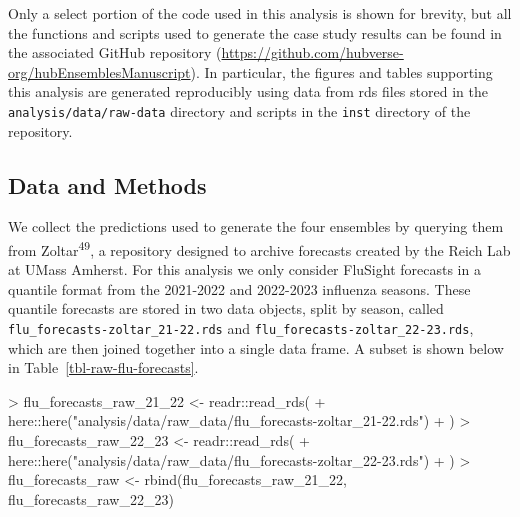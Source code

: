 \documentclass[
  letterpaper,
  DIV=11,
  numbers=noendperiod]{scrartcl}
\newenvironment{Shaded}{\begin{snugshade}}{\end{snugshade}}
\newcommand{\FunctionTok}[1]{\textcolor[rgb]{0.28,0.35,0.67}{#1}}
\newcommand{\NormalTok}[1]{\textcolor[rgb]{0.00,0.23,0.31}{#1}}
\newcommand{\OtherTok}[1]{\textcolor[rgb]{0.00,0.23,0.31}{#1}}
\newcommand{\SpecialCharTok}[1]{\textcolor[rgb]{0.37,0.37,0.37}{#1}}
\newcommand{\StringTok}[1]{\textcolor[rgb]{0.13,0.47,0.30}{#1}}
\begin{document}
Only a select portion of the code used in this analysis is shown for
brevity, but all the functions and scripts used to generate the case
study results can be found in the associated GitHub repository
(\url{https://github.com/hubverse-org/hubEnsemblesManuscript}). In
particular, the figures and tables supporting this analysis are
generated reproducibly using data from rds files stored in the
\texttt{analysis/data/raw-data} directory and scripts in the
\texttt{inst} directory of the repository.

\subsection{Data and Methods}\label{data-and-methods}

We collect the predictions used to generate the four ensembles by
querying them from Zoltar\textsuperscript{49}, a repository designed to
archive forecasts created by the Reich Lab at UMass Amherst. For this
analysis we only consider FluSight forecasts in a quantile format from
the 2021-2022 and 2022-2023 influenza seasons. These quantile forecasts
are stored in two data objects, split by season, called
\texttt{flu\_forecasts-zoltar\_21-22.rds} and
\texttt{flu\_forecasts-zoltar\_22-23.rds}, which are then joined
together into a single data frame. A subset is shown below in
Table~\ref{tbl-raw-flu-forecasts}.

\begin{Shaded}
\begin{Highlighting}[]
\SpecialCharTok{\textgreater{}}\NormalTok{ flu\_forecasts\_raw\_21\_22 }\OtherTok{\textless{}{-}}\NormalTok{ readr}\SpecialCharTok{::}\FunctionTok{read\_rds}\NormalTok{(}
\SpecialCharTok{+}\NormalTok{   here}\SpecialCharTok{::}\FunctionTok{here}\NormalTok{(}\StringTok{"analysis/data/raw\_data/flu\_forecasts{-}zoltar\_21{-}22.rds"}\NormalTok{)}
\SpecialCharTok{+}\NormalTok{ )}
\SpecialCharTok{\textgreater{}}\NormalTok{ flu\_forecasts\_raw\_22\_23 }\OtherTok{\textless{}{-}}\NormalTok{ readr}\SpecialCharTok{::}\FunctionTok{read\_rds}\NormalTok{(}
\SpecialCharTok{+}\NormalTok{   here}\SpecialCharTok{::}\FunctionTok{here}\NormalTok{(}\StringTok{"analysis/data/raw\_data/flu\_forecasts{-}zoltar\_22{-}23.rds"}\NormalTok{)}
\SpecialCharTok{+}\NormalTok{ )}
\SpecialCharTok{\textgreater{}}\NormalTok{ flu\_forecasts\_raw }\OtherTok{\textless{}{-}} \FunctionTok{rbind}\NormalTok{(flu\_forecasts\_raw\_21\_22, flu\_forecasts\_raw\_22\_23)}
\end{Highlighting}
\end{Shaded}
\end{document}
